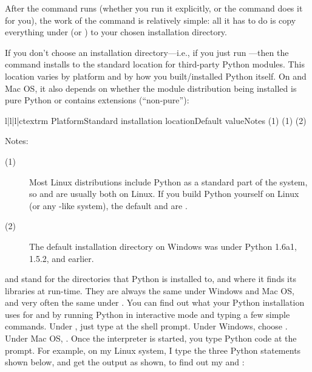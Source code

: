 \documentclass{howto}
\begin{document}
After the  command runs (whether you run it explicitly,
or the  command does it for you), the work of the
 command is relatively simple: all it has to do is copy
everything under  (or )
to your chosen installation directory.

If you don't choose an installation directory---i.e., if you just run
---then the  command installs to
the standard location for third-party Python modules.  This location
varies by platform and by how you built/installed Python itself.  On
\UNIX{} and Mac OS, it also depends on whether the module distribution
being installed is pure Python or contains extensions (``non-pure''):
\begin{tableiv}{l|l|l|c}{textrm}%
  {Platform}{Standard installation location}{Default value}{Notes}
          {}
          {}
          {(1)}
          {}
          {}
          {(1)}
          {}
          {}
          {(2)}
          {}
          {}
          {}
          {}
          {}
          {}
\end{tableiv}

\noindent Notes:
\begin{description}
\item[(1)] Most Linux distributions include Python as a standard part of
  the system, so  and  are usually
  both  on Linux.  If you build Python yourself on Linux (or
  any \UNIX-like system), the default  and
   are .
\item[(2)] The default installation directory on Windows was
   under
  Python 1.6a1, 1.5.2, and earlier.
\end{description}

 and  stand for the directories
that Python is installed to, and where it finds its libraries at
run-time.  They are always the same under Windows and Mac OS, and very
often the same under \UNIX.  You can find out what your Python
installation uses for  and  by
running Python in interactive mode and typing a few simple commands.
Under \UNIX, just type  at the shell prompt.  Under
Windows, choose .  Under Mac OS, .
Once the interpreter is started, you type Python code at the
prompt.  For example, on my Linux system, I type the three Python
statements shown below, and get the output as shown, to find out my
 and :
\end{document}
